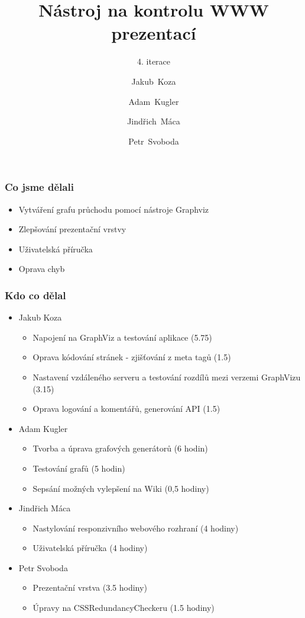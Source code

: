 \documentclass{beamer}
\begin{document}
\title [NKWP]{Nástroj na kontrolu WWW prezentací}
\author[J.~ Koza, A.~ Kugler, J.~Máca, P.~Svoboda]{Jakub~Koza \and Adam~Kugler \and Jindřich~Máca \and Petr~Svoboda}

\subtitle{4. iterace}
\frame{\titlepage}
\begin{frame}[allowframebreaks]\frametitle{Co jsme dělali}
   \begin{itemize}
    \item Vytváření grafu průchodu pomocí nástroje Graphviz
		\item Zlepšování prezentační vrstvy
		\item Uživatelská příručka
		\item Oprava chyb
   \end{itemize}
\end{frame}

\begin{frame}[allowframebreaks]\frametitle{Kdo co dělal} 
  \begin{itemize}
    \item Jakub Koza
      \begin{itemize}
       \item Napojení na GraphViz a testování aplikace (5.75)
       \item Oprava kódování stránek - zjišťování z meta tagů (1.5)
       \item Nastavení vzdáleného serveru a testování rozdílů mezi verzemi GraphVizu (3.15)
       \item Oprava logování a komentářů, generování API (1.5)
     \end{itemize}

    \item Adam Kugler
      \begin{itemize}
       \item Tvorba a úprava grafových generátorů (6 hodin)
       \item Testování grafů (5 hodin)
       \item Sepsání možných vylepšení na Wiki (0,5 hodiny)
     \end{itemize}

    \item Jindřich Máca
      \begin{itemize}
       \item Nastylování responzivního webového rozhraní (4 hodiny)
			 \item Uživatelská příručka (4 hodiny)
     \end{itemize}

    \item Petr Svoboda
      \begin{itemize}
       \item Prezentační vrstva (3.5 hodiny)
       \item Úpravy na CSSRedundancyCheckeru (1.5 hodiny)
     \end{itemize}
   \end{itemize}  
\end{frame} 
\end{document}
